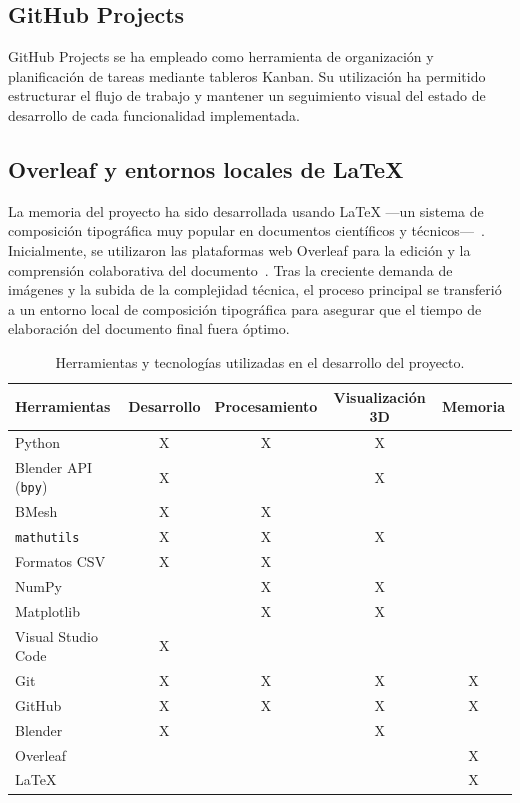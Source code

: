 \subsection{GitHub Projects}

GitHub Projects se ha empleado como herramienta de organización y planificación de tareas mediante tableros Kanban. Su utilización ha permitido estructurar el flujo de trabajo y mantener un seguimiento visual del estado de desarrollo de cada funcionalidad implementada.

\subsection{Overleaf y entornos locales de LaTeX}

La memoria del proyecto ha sido desarrollada usando \LaTeX{} —un sistema de composición tipográfica muy popular en documentos científicos y técnicos—~\cite{wiki:latex}. Inicialmente, se utilizaron las plataformas web Overleaf para la edición y la comprensión colaborativa del documento~\cite{overleaf}. Tras la creciente demanda de imágenes y la subida de la complejidad técnica, el proceso principal se transferió a un entorno local de composición tipográfica para asegurar que el tiempo de elaboración del documento final fuera óptimo.

\begin{table}[H]
\centering
\small
\setlength{\tabcolsep}{4pt}
\renewcommand{\arraystretch}{1.15}
\begin{tabularx}{\textwidth}{Xcccc}
\toprule
\textbf{Herramientas} & 
\textbf{Desarrollo} & 
\textbf{Procesamiento} & 
\textbf{Visualización 3D} & 
\textbf{Memoria} \\
\midrule
Python                      & X & X & X &   \\
Blender API (\texttt{bpy})  & X &   & X &   \\
BMesh                       & X & X &   &   \\
\texttt{mathutils}          & X & X & X &   \\
Formatos CSV                & X & X &   &   \\
NumPy                       &   & X & X &   \\
Matplotlib                  &   & X & X &   \\
Visual Studio Code          & X &   &   &   \\
Git                         & X & X & X & X \\
GitHub                      & X & X & X & X \\
Blender                     & X &   & X &   \\
Overleaf                    &   &   &   & X \\
LaTeX                       &   &   &   & X \\
\bottomrule
\end{tabularx}
\caption{Herramientas y tecnologías utilizadas en el desarrollo del proyecto.}
\label{tab:herramientas}
\end{table}
